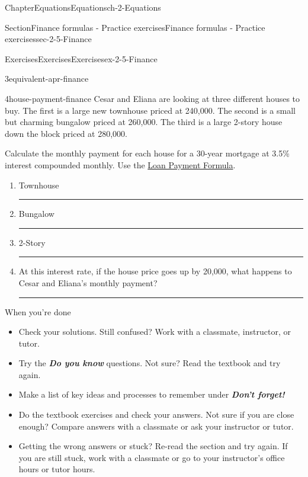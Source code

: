 \documentclass[twoside,11pt,]{book}
\newcommand{\alert}[1]{\textbf{\textit{#1}}}
\newlength{\workspacestrutwidth}
\numberwithin{equation}{section}
\begin{document}
\begin{chapterptx}{Chapter}{Equations}{}{Equations}{}{}{ch-2-Equations}
\begin{sectionptx}{Section}{Finance formulas - Practice exercises}{}{Finance formulas - Practice exercises}{}{}{sec-2-5-Finance}
\begin{exercises-subsection-numberless}{Exercises}{Exercises}{}{Exercises}{}{}{ex-2-5-Finance}
\begin{divisionexercise}{3}{}{}{equivalent-apr-finance}
\begin{enumerate}[label=(\alph*),ref=\alph*]
\end{enumerate}%
\end{divisionexercise}%
\clearpage
\begin{divisionexercise}{4}{}{}{house-payment-finance}%
Cesar and Eliana are looking at three different houses to buy. The first is a large new townhouse priced at \textdollar{}240,000. The second is a small but charming bungalow priced at \textdollar{}260,000. The third is a large 2-story house down the block priced at \textdollar{}280,000.%
 \par
Calculate the monthly payment for each house for a 30-year mortgage at 3.5\% interest compounded monthly. Use the \hyperref[loan-payment-formula]{Loan Payment Formula}.%
\begin{enumerate}[label=(\alph*),ref=\alph*]%
\item{}Townhouse%
\par\rule{\workspacestrutwidth}{1.4in}%
\item{}Bungalow%
\par\rule{\workspacestrutwidth}{1.4in}%
\item{}2-Story%
\par\rule{\workspacestrutwidth}{1.4in}%
\item{}At this interest rate, if the house price goes up by \textdollar{}20,000, what happens to Cesar and Eliana's monthly payment?%
\par\rule{\workspacestrutwidth}{1.4in}%
\end{enumerate}%
\end{divisionexercise}%
\end{exercises-subsection-numberless}
\begin{conclusion}{When you're done \textellipsis{}}%
%
\begin{itemize}[label=\textbullet]
\item{}Check your solutions. Still confused? Work with a classmate, instructor, or tutor.%
\item{}Try the \alert{Do you know} questions. Not sure? Read the textbook and try again.%
\item{}Make a list of key ideas and processes to remember under \alert{Don't forget!}%
\item{}Do the textbook exercises and check your answers. Not sure if you are close enough? Compare answers with a classmate or ask your instructor or tutor.%
\item{}Getting the wrong answers or stuck? Re-read the section and try again. If you are still stuck, work with a classmate or go to your instructor's office hours or tutor hours.%

\end{itemize}
\end{conclusion}
\end{sectionptx}
\end{chapterptx}
\end{document}
